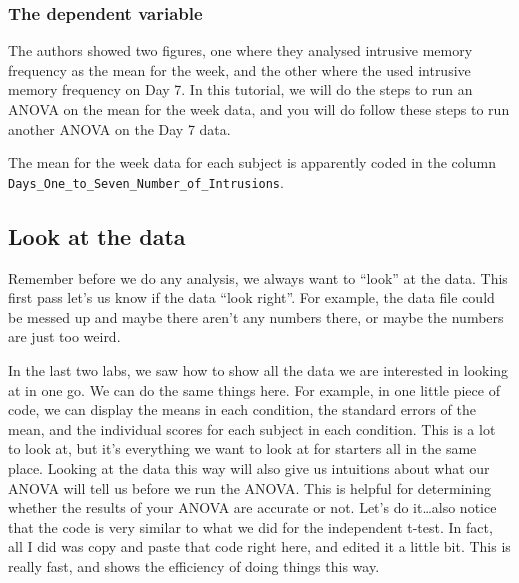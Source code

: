 \documentclass[
]{book}
\begin{document}
\hypertarget{the-dependent-variable}{%
\subsubsection{The dependent variable}\label{the-dependent-variable}}

The authors showed two figures, one where they analysed intrusive memory frequency as the mean for the week, and the other where the used intrusive memory frequency on Day 7. In this tutorial, we will do the steps to run an ANOVA on the mean for the week data, and you will do follow these steps to run another ANOVA on the Day 7 data.

The mean for the week data for each subject is apparently coded in the column \texttt{Days\_One\_to\_Seven\_Number\_of\_Intrusions}.

\hypertarget{look-at-the-data-2}{%
\subsection{Look at the data}\label{look-at-the-data-2}}

Remember before we do any analysis, we always want to ``look'' at the data. This first pass let's us know if the data ``look right''. For example, the data file could be messed up and maybe there aren't any numbers there, or maybe the numbers are just too weird.

In the last two labs, we saw how to show all the data we are interested in looking at in one go. We can do the same things here. For example, in one little piece of code, we can display the means in each condition, the standard errors of the mean, and the individual scores for each subject in each condition. This is a lot to look at, but it's everything we want to look at for starters all in the same place. Looking at the data this way will also give us intuitions about what our ANOVA will tell us before we run the ANOVA. This is helpful for determining whether the results of your ANOVA are accurate or not. Let's do it\ldots also notice that the code is very similar to what we did for the independent t-test. In fact, all I did was copy and paste that code right here, and edited it a little bit. This is really fast, and shows the efficiency of doing things this way.
\end{document}
